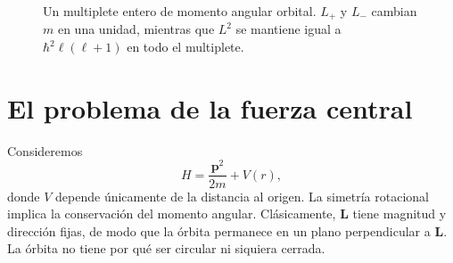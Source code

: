 \begin{figure}[htbp]
\centering
{}
\caption{Un multiplete entero de momento angular orbital. \(L_+\) y \(L_-\) cambian \(m\) en una unidad, mientras que \(L^2\) se mantiene igual a \(\hbar^2\ell(\ell+1)\) en todo el multiplete.}
\end{figure}

\section{El problema de la fuerza central}

Consideremos
\begin{equation}
H=\frac{\mathbf p^2}{2m}+V(r),
\end{equation}
donde \(V\) depende únicamente de la distancia al origen. La simetría rotacional implica la conservación del momento angular. Clásicamente, \(\mathbf L\) tiene magnitud y dirección fijas, de modo que la órbita permanece en un plano perpendicular a \(\mathbf L\). La órbita no tiene por qué ser circular ni siquiera cerrada.

